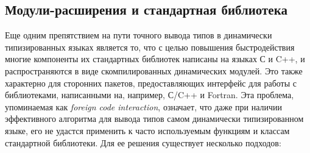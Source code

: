 

\subsection{Модули-расширения и стандартная библиотека}
\label{sub:extensions-and-stdlib}

Еще одним препятствием на пути точного вывода типов в динамически типизированных
языках является то, что с целью повышения быстродействия многие компоненты их
стандартных библиотек написаны на языках С и C++, и распространяются в виде
скомпилированных динамических модулей. Это также характерно для сторонних
пакетов, предоставляющих интерфейс для работы с библиотеками, написанными на,
например, С/C++ и Fortran.
Эта проблема, упоминаемая как \emph{foreign code interaction}, означает, что даже при
наличии эффективного алгоритма для вывода типов самом динамически типизированном
языке, его не удастся применить к часто используемым функциям и классам
стандартной библиотеки. Для ее решения существует несколько подходов:

